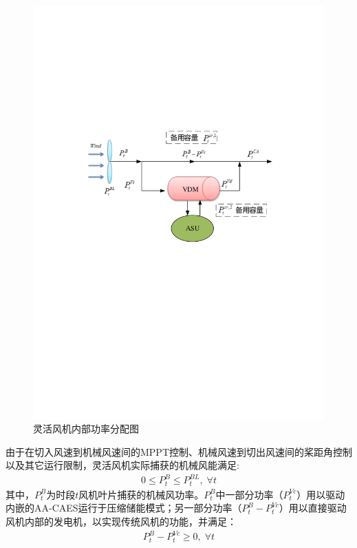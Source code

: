 \begin{figure}[H] %
  \centering
  \includegraphics[scale=0.72]{figures/Chap5-CAWT-Power-Flow-V2.pdf}
  \caption{灵活风机内部功率分配图}
  \label{fig:CAWT-Power-Flow}
\end{figure}

由于在切入风速到机械风速间的MPPT控制、机械风速到切出风速间的桨距角控制以及其它运行限制，灵活风机实际捕获的机械风能满足:
\begin{gather}
\label{eq:CA-WT-Wind-Blade-Limit-1}
0 \le P_t^B \le P_t^{BL},\; \forall t
\end{gather}
其中，$P_t^B$为时段$t$风机叶片捕获的机械风功率。$P_t^B$中一部分功率（$P_t^{Vc}$）用以驱动内嵌的AA-CAES运行于压缩储能模式；另一部分功率（$P_t^B - P_t^{Vc}$）用以直接驱动风机内部的发电机，以实现传统风机的功能，并满足：
\begin{gather}
\label{eq:CA-WT-Wind-Blade-Limit-2}
P_t^B - P_t^{Vc} \ge 0,\;\forall t
\end{gather}

